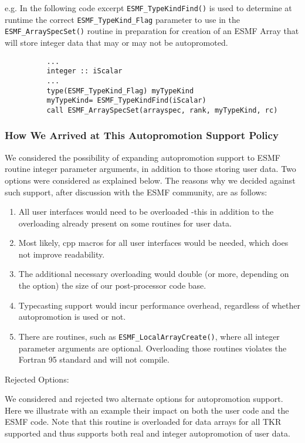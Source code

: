 \begin{enumerate}
      e.g. In the following code excerpt {\tt ESMF\_TypeKindFind()} is used to determine at runtime the correct {\tt ESMF\_TypeKind\_Flag} parameter to use in the {\tt ESMF\_ArraySpecSet()} routine in preparation for creation of an ESMF Array that will store integer data that may or may not be autopromoted.
\begin{verbatim}
          ...
          integer :: iScalar
          ...
          type(ESMF_TypeKind_Flag) myTypeKind
          myTypeKind= ESMF_TypeKindFind(iScalar)
          call ESMF_ArraySpecSet(arrayspec, rank, myTypeKind, rc)
\end{verbatim}
\end{enumerate}

\subsubsection{How We Arrived at This Autopromotion Support Policy}

We considered the possibility of expanding autopromotion support to ESMF routine integer parameter arguments, in addition to those storing user data. Two options were considered as explained below. The reasons why we decided against such support, after discussion with the ESMF community, are as follows:
\begin{enumerate}
\item All user interfaces would need to be overloaded -this in addition to the overloading already present on some routines for user data.
\item Most likely, cpp macros for all user interfaces would be needed, which does not improve readability.
\item The additional necessary overloading would double (or more, depending on the option) the size of our post-processor code base.
\item Typecasting support would incur performance overhead, regardless of whether autopromotion is used or not.
\item There are routines, such as {\tt ESMF\_LocalArrayCreate()}, where all integer parameter arguments are optional. Overloading those routines violates the Fortran 95 standard and will not compile.
\end{enumerate}

Rejected Options:

We considered and rejected two alternate options for autopromotion support. Here we illustrate with an example their impact on both the user code and the ESMF code. Note that this routine is overloaded for data arrays for all TKR supported and thus supports both real and integer autopromotion of user data.

